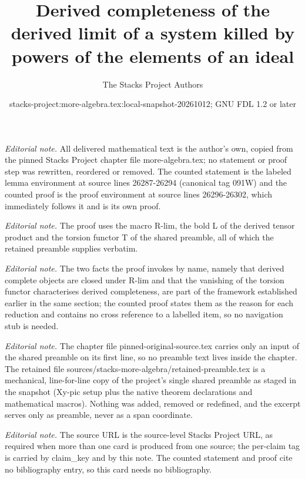 \documentclass[10pt,a4paper]{amsart}
\title{Derived completeness of the derived limit of a system killed by powers of the elements of an ideal}
\author{The Stacks Project Authors}
\date{stacks-project:more-algebra.tex:local-snapshot-20261012; GNU FDL 1.2 or later}
\theoremstyle{plain}
\theoremstyle{definition}
\theoremstyle{remark}
\numberwithin{equation}{subsection}
\begin{document}
\maketitle
\setcounter{subsection}{1}
\noindent\textit{Editorial note.} All delivered mathematical text is the author's own, copied from the pinned Stacks Project chapter file more-algebra.tex; no statement or proof step was rewritten, reordered or removed. The counted statement is the labeled lemma environment at source lines 26287-26294 (canonical tag 091W) and the counted proof is the proof environment at source lines 26296-26302, which immediately follows it and is its own proof.\par\medskip
\noindent\textit{Editorial note.} The proof uses the macro R-lim, the bold L of the derived tensor product and the torsion functor T of the shared preamble, all of which the retained preamble supplies verbatim.\par\medskip
\noindent\textit{Editorial note.} The two facts the proof invokes by name, namely that derived complete objects are closed under R-lim and that the vanishing of the torsion functor characterises derived completeness, are part of the framework established earlier in the same section; the counted proof states them as the reason for each reduction and contains no cross reference to a labelled item, so no navigation stub is needed.\par\medskip
\noindent\textit{Editorial note.} The chapter file pinned-original-source.tex carries only an input of the shared preamble on its first line, so no preamble text lives inside the chapter. The retained file sources/stacks-more-algebra/retained-preamble.tex is a mechanical, line-for-line copy of the project's single shared preamble as staged in the snapshot (Xy-pic setup plus the native theorem declarations and mathematical macros). Nothing was added, removed or redefined, and the excerpt serves only as preamble, never as a span coordinate.\par\medskip
\noindent\textit{Editorial note.} The source URL is the source-level Stacks Project URL, as required when more than one card is produced from one source; the per-claim tag is carried by claim\_key and by this note. The counted statement and proof cite no bibliography entry, so this card needs no bibliography.\par\medskip
\end{document}

